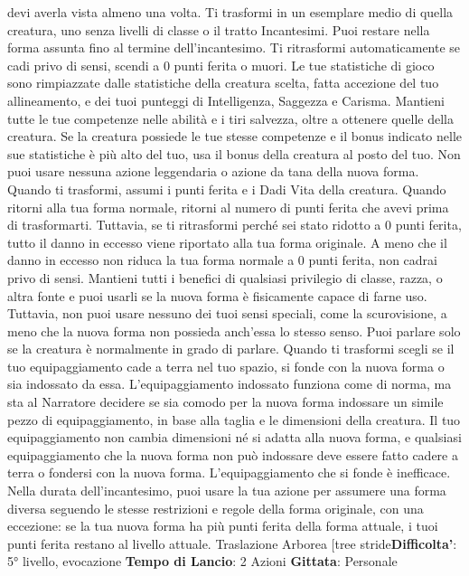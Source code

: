 \begin{multicols}{2}
devi averla vista almeno una volta. Ti trasformi in un
esemplare medio di quella creatura, uno senza livelli di
classe o il tratto Incantesimi.
Puoi restare nella forma assunta fino al termine
dell’incantesimo. Ti ritrasformi automaticamente se cadi
privo di sensi, scendi a 0 punti ferita o muori.
Le tue statistiche di gioco sono rimpiazzate dalle
statistiche della creatura scelta, fatta accezione del tuo
allineamento, e dei tuoi punteggi di Intelligenza,
Saggezza e Carisma. Mantieni tutte le tue competenze
nelle abilità e i tiri salvezza, oltre a ottenere quelle della
creatura. Se la creatura possiede le tue stesse
competenze e il bonus indicato nelle sue statistiche è
più alto del tuo, usa il bonus della creatura al posto del
tuo. Non puoi usare nessuna azione leggendaria o
azione da tana della nuova forma.
Quando ti trasformi, assumi i punti ferita e i Dadi Vita
della creatura. Quando ritorni alla tua forma normale,
ritorni al numero di punti ferita che avevi prima di
trasformarti. Tuttavia, se ti ritrasformi perché sei stato
ridotto a 0 punti ferita, tutto il danno in eccesso viene
riportato alla tua forma originale. A meno che il danno in
eccesso non riduca la tua forma normale a 0 punti
ferita, non cadrai privo di sensi.
Mantieni tutti i benefici di qualsiasi privilegio di classe,
razza, o altra fonte e puoi usarli se la nuova forma è
fisicamente capace di farne uso. Tuttavia, non puoi
usare nessuno dei tuoi sensi speciali, come la
scurovisione, a meno che la nuova forma non possieda
anch’essa lo stesso senso. Puoi parlare solo se la
creatura è normalmente in grado di parlare.
Quando ti trasformi scegli se il tuo equipaggiamento
cade a terra nel tuo spazio, si fonde con la nuova forma
o sia indossato da essa. L’equipaggiamento indossato
funziona come di norma, ma sta al Narratore decidere se sia
comodo per la nuova forma indossare un simile pezzo
di equipaggiamento, in base alla taglia e le dimensioni
della creatura. Il tuo equipaggiamento non cambia
dimensioni né si adatta alla nuova forma, e qualsiasi
equipaggiamento che la nuova forma non può
indossare deve essere fatto cadere a terra o fondersi
con la nuova forma. L’equipaggiamento che si fonde è
inefficace.
Nella durata dell’incantesimo, puoi usare la tua azione
per assumere una forma diversa seguendo le stesse
restrizioni e regole della forma originale, con una
eccezione: se la tua nuova forma ha più punti ferita
della forma attuale, i tuoi punti ferita restano al livello
attuale.
Traslazione Arborea
[tree stride\textbf{Difficolta'}:
5° livello, evocazione
\textbf{Tempo di Lancio}: 2 Azioni
\textbf{Gittata}: Personale

\end{multicols}
